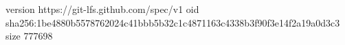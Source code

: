 version https://git-lfs.github.com/spec/v1
oid sha256:1be4880b5578762024c41bbb5b32c1c4871163c4338b3f90f3e14f2a19a0d3c3
size 777698
